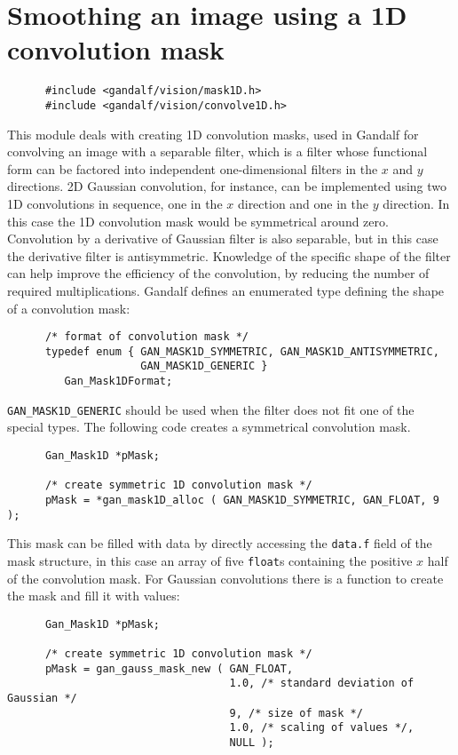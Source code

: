 \section{Smoothing an image using a 1D convolution mask}
\begin{verbatim}
      #include <gandalf/vision/mask1D.h>
      #include <gandalf/vision/convolve1D.h>
\end{verbatim}
This module deals with creating 1D convolution masks, used in Gandalf for
convolving an image with a separable filter,
which is a filter whose functional form can be factored into independent
one-dimensional filters in the $x$ and $y$ directions.
2D Gaussian convolution, for instance, can be implemented using two
1D convolutions in sequence, one in the $x$ direction and one in the
$y$ direction. In this case the 1D convolution mask would be symmetrical
around zero. Convolution by a derivative of Gaussian filter is also
separable, but in this case the derivative filter is antisymmetric.
Knowledge of the specific shape of the filter can help improve the
efficiency of the convolution, by reducing the number of required
multiplications. Gandalf defines an enumerated type defining the shape
of a convolution mask:
\begin{verbatim}
      /* format of convolution mask */
      typedef enum { GAN_MASK1D_SYMMETRIC, GAN_MASK1D_ANTISYMMETRIC,
                     GAN_MASK1D_GENERIC }
         Gan_Mask1DFormat;
\end{verbatim}
{\tt GAN\_MASK1D\_GENERIC} should be used when the filter does not fit
one of the special types. The following code creates a symmetrical
convolution mask.
\begin{verbatim}
      Gan_Mask1D *pMask;

      /* create symmetric 1D convolution mask */
      pMask = *gan_mask1D_alloc ( GAN_MASK1D_SYMMETRIC, GAN_FLOAT, 9 );
\end{verbatim}
This mask can be filled with data by directly accessing the {\tt data.f}
field of the mask structure, in this case an array of five {\tt float}s
containing the positive $x$ half of the convolution mask.
For Gaussian convolutions there is a
function to create the mask and fill it with values:
\begin{verbatim}
      Gan_Mask1D *pMask;

      /* create symmetric 1D convolution mask */
      pMask = gan_gauss_mask_new ( GAN_FLOAT,
                                   1.0, /* standard deviation of Gaussian */
                                   9, /* size of mask */
                                   1.0, /* scaling of values */,
                                   NULL );
\end{verbatim}
